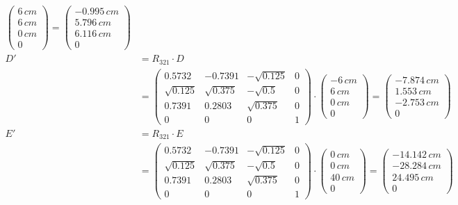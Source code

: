 \begin{align*}
\begin{pmatrix}
6\,cm \\
6\,cm \\
0\,cm \\
0
\end{pmatrix}
=
\begin{pmatrix}
-0.995\,cm \\
5.796\,cm \\
6.116\,cm \\
0
\end{pmatrix}\\
D' &= R_{321} \cdot D \\
&= 
\begin{pmatrix}
0.5732  & -0.7391 & -\sqrt{0.125}& 0 \\
\sqrt{0.125} & \sqrt{0.375} & -\sqrt{0.5} & 0 \\
0.7391 & 0.2803 & \sqrt{0.375} & 0 \\
0 & 0 & 0 & 1 
\end{pmatrix}
\cdot 
\begin{pmatrix}
- 6\,cm \\
6\,cm \\
0\,cm \\
0
\end{pmatrix}
=
\begin{pmatrix}
-7.874\,cm \\
1.553\,cm \\
-2.753\,cm \\
0
\end{pmatrix}\\
E' &= R_{321} \cdot E \\
&= 
\begin{pmatrix}
0.5732  & -0.7391 & -\sqrt{0.125}& 0 \\
\sqrt{0.125} & \sqrt{0.375} & -\sqrt{0.5} & 0 \\
0.7391 & 0.2803 & \sqrt{0.375} & 0 \\
0 & 0 & 0 & 1 
\end{pmatrix}
\cdot 
\begin{pmatrix}
0\,cm \\
0\,cm \\
40\,cm \\
0
\end{pmatrix}
=
\begin{pmatrix}
-14.142\,cm \\
-28.284\,cm \\
24.495\,cm \\
0
\end{pmatrix}\\
\end{align*}

